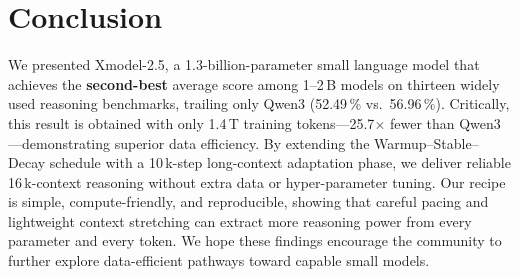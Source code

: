 \section{Conclusion}
We presented Xmodel-2.5, a 1.3-billion-parameter small language model that achieves the \textbf{second-best} average score among 1--2\,B models on thirteen widely used reasoning benchmarks, trailing only Qwen3 (52.49\,\% vs.\ 56.96\,\%).
Critically, this result is obtained with only 1.4\,T training tokens---25.7$\times$ fewer than Qwen3---demonstrating superior data efficiency.
By extending the Warmup--Stable--Decay schedule with a 10\,k-step long-context adaptation phase, we deliver reliable 16\,k-context reasoning without extra data or hyper-parameter tuning.
Our recipe is simple, compute-friendly, and reproducible, showing that careful pacing and lightweight context stretching can extract more reasoning power from every parameter and every token.
We hope these findings encourage the community to further explore data-efficient pathways toward capable small models.